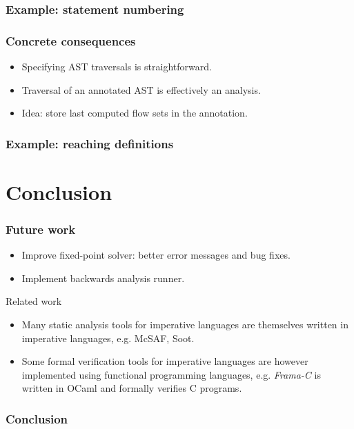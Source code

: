 \documentclass{beamer}
\begin{document}
\begin{frame}
  \frametitle{Example: statement numbering}
\end{frame}

\begin{frame}
  \frametitle{Concrete consequences}

  \begin{itemize}
    \item Specifying AST traversals is straightforward.
    \item Traversal of an annotated AST is effectively an analysis.
    \item Idea: store last computed flow sets in the annotation.
  \end{itemize}
\end{frame}

\begin{frame}
  \frametitle{Example: reaching definitions}
\end{frame}

\section{Conclusion}

\begin{frame}
  \frametitle{Future work}

  \begin{itemize}
    \item Improve fixed-point solver: better error messages and bug fixes.
    \item Implement backwards analysis runner.
  \end{itemize}
\end{frame}

\begin{frame}
  \begin{block}{Related work}
    \begin{itemize}
      \item
        Many static analysis tools for imperative languages are themselves
        written in imperative languages, e.g. McSAF, Soot.
      \item
        Some formal verification tools for imperative languages are however
        implemented using functional programming languages, e.g. \emph{Frama-C}
        is written in OCaml and formally verifies C programs.
    \end{itemize}
  \end{block}
\end{frame}

\begin{frame}
  \frametitle{Conclusion}
\end{frame}
\end{document}

